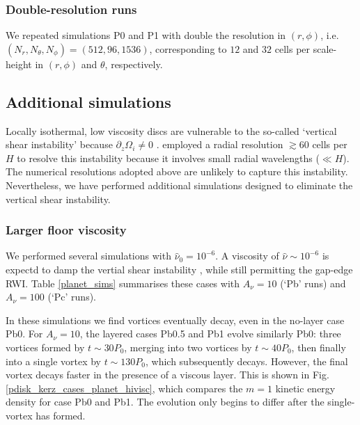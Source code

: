 \subsubsection{Double-resolution runs}%

We repeated simulations P0 and P1 with double the resolution in
$(r,\phi)$, i.e. $(N_r,N_\theta,N_\phi)=(512,96,1536)$, corresponding
to $12$ and $32$ cells per scale-height in $(r,\phi)$ and $\theta$,
respectively.  



\subsection{Additional simulations}%
Locally isothermal, low viscosity discs are vulnerable to the
so-called `vertical shear 
instability' because $\partial_z\Omega_i\neq 0$ \citep{nelson12}. 
\citeauthor{nelson12} employed a radial  resolution $\gtrsim 60$ cells
per $H$ to resolve this instability because it involves small radial
wavelengths ($\ll H$). The numerical resolutions adopted
above are unlikely to capture this instability. Nevertheless, we have
performed additional simulations designed to eliminate the vertical shear
instability.  

\subsubsection{Larger floor viscosity}
We performed several simulations with $\hat{\nu}_0=10^{-6}$. A viscosity of
$\hat{\nu}\sim 10^{-6}$ is expectd to damp the vertial shear 
instability \citep{nelson12}, while still permitting the gap-edge
RWI. Table \ref{planet_sims} summarises
these cases with $A_\nu=10$ (`Pb' runs) and $A_\nu=100$ (`Pc' runs). 

In these simulations we find vortices eventually decay, even in the
no-layer case Pb0. For $A_\nu=10$, the layered cases Pb0.5 and Pb1 evolve
similarly Pb0: three vortices formed by $t\sim30P_0$, merging into two
vortices by $t\sim40P_0$, then finally into a single vortex by
$t\sim130P_0$, which subsequently decays. However, the final vortex
decays faster in the presence of a viscous layer. This is shown in
Fig. \ref{pdisk_kerz_cases_planet_hivisc}, which compares the $m=1$
kinetic energy density for case Pb0 and Pb1. The evolution only begins
to differ after the single-vortex has formed. 

